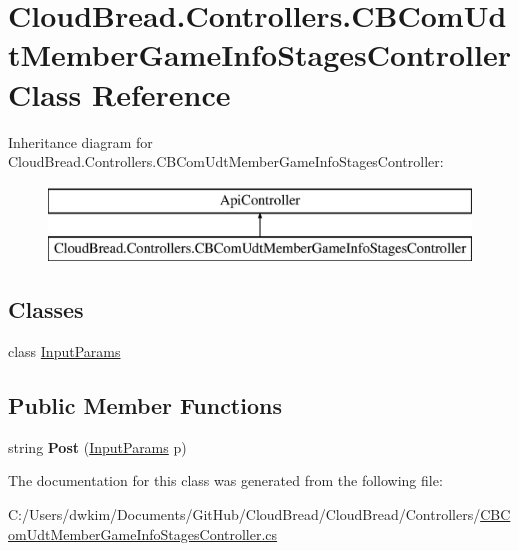 \hypertarget{class_cloud_bread_1_1_controllers_1_1_c_b_com_udt_member_game_info_stages_controller}{}\section{Cloud\+Bread.\+Controllers.\+C\+B\+Com\+Udt\+Member\+Game\+Info\+Stages\+Controller Class Reference}
\label{class_cloud_bread_1_1_controllers_1_1_c_b_com_udt_member_game_info_stages_controller}
Inheritance diagram for Cloud\+Bread.\+Controllers.\+C\+B\+Com\+Udt\+Member\+Game\+Info\+Stages\+Controller\+:\begin{figure}[H]
\begin{center}
\leavevmode
\includegraphics[height=2.000000cm]{class_cloud_bread_1_1_controllers_1_1_c_b_com_udt_member_game_info_stages_controller}
\end{center}
\end{figure}
\subsection*{Classes}
\begin{DoxyCompactItemize}
\item 
class \hyperlink{class_cloud_bread_1_1_controllers_1_1_c_b_com_udt_member_game_info_stages_controller_1_1_input_params}{Input\+Params}
\end{DoxyCompactItemize}
\subsection*{Public Member Functions}
\begin{DoxyCompactItemize}
\item 
string {\bfseries Post} (\hyperlink{class_cloud_bread_1_1_controllers_1_1_c_b_com_udt_member_game_info_stages_controller_1_1_input_params}{Input\+Params} p)\hypertarget{class_cloud_bread_1_1_controllers_1_1_c_b_com_udt_member_game_info_stages_controller_a78f66a6ead0aed77f1acca7a43650789}{}\label{class_cloud_bread_1_1_controllers_1_1_c_b_com_udt_member_game_info_stages_controller_a78f66a6ead0aed77f1acca7a43650789}

\end{DoxyCompactItemize}


The documentation for this class was generated from the following file\+:\begin{DoxyCompactItemize}
\item 
C\+:/\+Users/dwkim/\+Documents/\+Git\+Hub/\+Cloud\+Bread/\+Cloud\+Bread/\+Controllers/\hyperlink{_c_b_com_udt_member_game_info_stages_controller_8cs}{C\+B\+Com\+Udt\+Member\+Game\+Info\+Stages\+Controller.\+cs}\end{DoxyCompactItemize}
